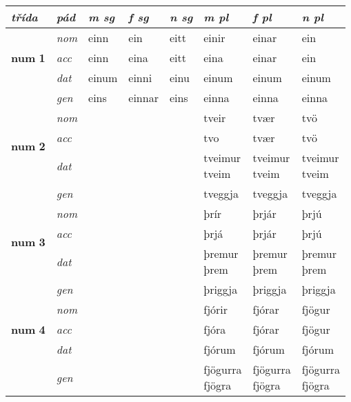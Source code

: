 \begin{longtable}[l]{l>{\footnotesize\itshape}lXXXXXX}
\toprule
 {\textbf{\textit{třída}}} & {\textit{pád}}   & {\textit{m sg}}  & {\textit{f sg}}  & {\textit{n sg}}     & {\textit{m pl}} & {\textit{f pl}}  & {\textit{n pl}} \\
\midrule
\endhead
\multirow{3}{*}{{{\textbf{num} \Large{\textbf{1}}}}}  &  nom & einn & ein    & eitt & einir & einar & ein \\*
  & acc &  einn  & eina   & eitt & eina & einar & ein \\*
&  dat & einum & einni   & einu & einum & einum & einum \\*
  & gen & eins  & einnar  & eins & einna & einna & einna\\
\midrule

\multirow{3}{*}{{{\textbf{num} \Large{\textbf{2}}}}}  &  nom &  &     &  & tveir & tvær & tvö \\*
  & acc &    &    &  & tvo & tvær & tvö \\*
&  dat &  &    &  & \specialcell{tveimur\\ tveim} & \specialcell{tveimur\\ tveim} & \specialcell{tveimur\\ tveim} \\*
  & gen &   &   &  & tveggja & tveggja & tveggja\\
\midrule

\multirow{3}{*}{{{\textbf{num} \Large{\textbf{3}}}}}  &  nom &  &     &  & þrír & þrjár & þrjú \\*
  & acc &    &    &  & þrjá & þrjár & þrjú \\*
&  dat &  &    &  & \specialcell{þremur\\ þrem} & \specialcell{þremur\\ þrem} & \specialcell{þremur\\ þrem} \\*
  & gen &   &   &  & þriggja & þriggja & þriggja\\
\midrule

\multirow{3}{*}{{{\textbf{num} \Large{\textbf{4}}}}}  &  nom &  &     &  & fjórir & fjórar & fjögur \\*
  & acc &    &    &  & fjóra & fjórar & fjögur \\*
&  dat &  &    &  & fjórum & fjórum & fjórum \\*
  & gen &   &   &  & \specialcell{fjögurra\\ fjögra} & \specialcell{fjögurra\\ fjögra} & \specialcell{fjögurra\\ fjögra}\\
\midrule


\end{longtable}
